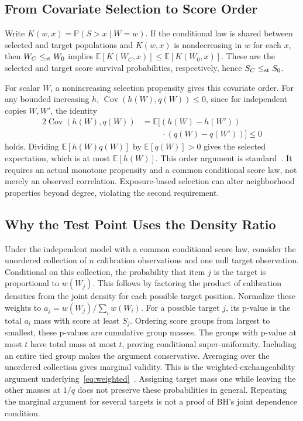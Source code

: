 \documentclass[twoside]{article}
\newcommand{\Prb}{\mathbb{P}}
\newcommand{\E}{\mathbb{E}}
\begin{document}
\subsection{From Covariate Selection to Score Order}
Write $K(w,x)=\Prb(S>x\mid W=w)$. If the conditional law is shared between selected and target populations and $K(w,x)$ is nondecreasing in $w$ for each $x$, then $W_C\le_{\rm st} W_0$ implies $\E[K(W_C,x)]\le\E[K(W_0,x)]$. These are the selected and target score survival probabilities, respectively, hence $S_C\le_{\rm st}S_0$.

For scalar $W$, a nonincreasing selection propensity gives this covariate order. For any bounded increasing $h$, $\operatorname{Cov}(h(W),q(W))\le0$, since for independent copies $W,W'$, the identity
\begin{align*}
 2\operatorname{Cov}(h(W),q(W))
 &=\E[(h(W)-h(W'))\\
 &\hspace{1cm}\cdot(q(W)-q(W'))]\le0
\end{align*}
holds. Dividing $\E[h(W)q(W)]$ by $\E[q(W)]>0$ gives the selected expectation, which is at most $\E[h(W)]$. This order argument is standard~\citep{shaked2007stochastic}. It requires an actual monotone propensity and a common conditional score law, not merely an observed correlation. Exposure-based selection can alter neighborhood properties beyond degree, violating the second requirement.

\subsection{Why the Test Point Uses the Density Ratio}
Under the independent model with a common conditional score law, consider the unordered collection of $n$ calibration observations and one null target observation. Conditional on this collection, the probability that item $j$ is the target is proportional to $w(W_j)$. This follows by factoring the product of calibration densities from the joint density for each possible target position. Normalize these weights to $a_j=w(W_j)/\sum_iw(W_i)$. For a possible target $j$, its p-value is the total $a_i$ mass with score at least $S_j$. Ordering score groups from largest to smallest, these p-values are cumulative group masses. The groups with p-value at most $t$ have total mass at most $t$, proving conditional super-uniformity. Including an entire tied group makes the argument conservative. Averaging over the unordered collection gives marginal validity. This is the weighted-exchangeability argument underlying~\eqref{eq:weighted}~\citep{tibshirani2019conformal}. Assigning target mass one while leaving the other masses at $1/q$ does not preserve these probabilities in general. Repeating the marginal argument for several targets is not a proof of BH's joint dependence condition.
\end{document}

